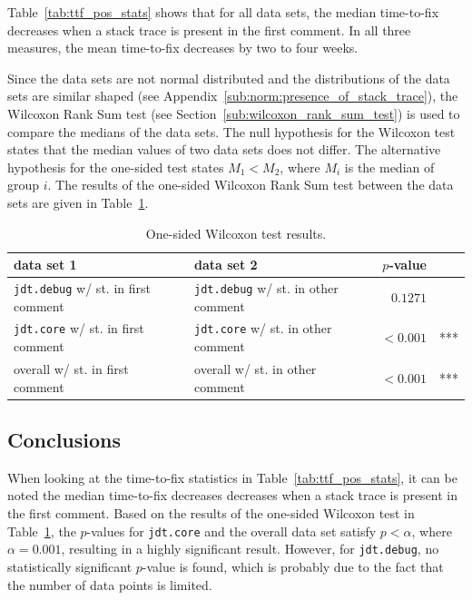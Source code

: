 Table~\ref{tab:ttf_pos_stats} shows that for all data sets, the median time-to-fix decreases when a stack trace is present in the first comment. In all three measures, the mean time-to-fix decreases by two to four weeks. 

Since the data sets are not normal distributed and the distributions of the data sets are similar shaped (see Appendix~\ref{sub:norm:presence_of_stack_trace}), the Wilcoxon Rank Sum test (see Section~\ref{sub:wilcoxon_rank_sum_test}) is used to compare the medians of the data sets.
The null hypothesis for the Wilcoxon test states that the median values of two data sets does not differ. The alternative hypothesis for the one-sided test states $M_1 < M_2$, where $M_i$ is the median of group $i$. The results of the one-sided Wilcoxon Rank Sum test between the data sets are given in Table~\ref{tab:wilcoxon_pos}.

\begin{table}[!ht]\footnotesize
	\centering
	\begin{tabular}{llrl}
		\toprule
		data set 1 & data set 2 & $p$-value & \\
		\midrule
		\texttt{jdt.debug} w/ st. in first comment & \texttt{jdt.debug} w/ st. in other comment & $0.1271$ & \\
		\texttt{jdt.core} w/ st. in first comment & \texttt{jdt.core} w/ st. in other comment & $< 0.001$ & *** \\
		overall  w/ st. in first comment & overall w/ st. in other comment & $< 0.001$ & *** \\
		\bottomrule
	\end{tabular} 
	\caption{One-sided Wilcoxon test results.}
	\label{tab:wilcoxon_pos}
\end{table}


\subsection{Conclusions} %
When looking at the time-to-fix statistics in Table~\ref{tab:ttf_pos_stats}, it can be noted the median time-to-fix decreases decreases when a stack trace is present in the first comment. Based on the results of the one-sided Wilcoxon test in Table~\ref{tab:wilcoxon_pos}, the $p$-values for \texttt{jdt.core} and the overall data set satisfy $p < \alpha$, where $\alpha = 0.001$, resulting in a highly significant result. However, for \texttt{jdt.debug}, no statistically significant $p$-value is found, which is probably due to the fact that the number of data points is limited.

